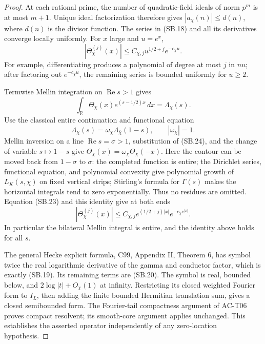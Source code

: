\begin{proof}
At each rational prime, the number of quadratic-field ideals of
norm \(p^m\) is at most \(m+1\).  Unique ideal factorization therefore
gives \(|a_\chi(n)|\leq d(n)\), where \(d(n)\) is the divisor
function.  The series in (SB.18) and all its derivatives converge
locally uniformly.  For \(x\) large and \(u=e^x\),
\[
 |\Theta_\chi^{(j)}(x)|
       \leq C_{\chi,j}u^{1/2+j}e^{-c_\chi u}.                  \tag{SB.23}
\]
For example, differentiating produces a polynomial of degree at
most \(j\) in \(nu\); after factoring out \(e^{-c_\chi u}\),
the remaining series is bounded uniformly for \(u\geq2\).

Termwise Mellin integration on \(\operatorname{Re}s>1\) gives
\[
 \int_{\mathbb R}\Theta_\chi(x)e^{(s-1/2)x}\,dx
       =\Lambda_\chi(s).
\]
Use the classical entire continuation and functional equation
\[
 \Lambda_\chi(s)=\omega_\chi\Lambda_{\overline\chi}(1-s),
 \qquad|\omega_\chi|=1.
                                                               \tag{SB.24}
\]
Mellin inversion on a line \(\operatorname{Re}s=\sigma>1\),
substitution of (SB.24), and the change of variable \(s\mapsto1-s\)
give
\(\Theta_\chi(x)=\omega_\chi\Theta_{\overline\chi}(-x)\).
Here the contour can be moved back from \(1-\sigma\) to \(\sigma\):
the completed function is entire; the Dirichlet series,
functional equation, and polynomial convexity give polynomial
growth of \(L_K(s,\chi)\) on fixed vertical strips; Stirling's
formula for \(\Gamma(s)\) makes the horizontal integrals tend
to zero exponentially.  Thus no residues are omitted.
Equation (SB.23) and this identity give at both ends
\[
 |\Theta_\chi^{(j)}(x)|
 \leq C_{\chi,j}e^{(1/2+j)|x|}
                              e^{-c_\chi e^{|x|}}.
                                                               \tag{SB.25}
\]
In particular the bilateral Mellin integral is entire, and the
identity above holds for all \(s\).

The general Hecke explicit formula, C99, Appendix II, Theorem 6,
has symbol twice the real logarithmic derivative of the gamma
and conductor factor, which is exactly (SB.19).
Its remaining terms are (SB.20).  The symbol is real, bounded
below, and \(2\log|t|+O_\chi(1)\) at infinity.  Restricting its
closed weighted Fourier form to \(I_L\), then adding the finite
bounded Hermitian translation sum, gives a closed semibounded
form.  The Fourier-tail compactness argument of AC-T06 proves
compact resolvent; its smooth-core argument applies unchanged.
This establishes the asserted operator independently of any
zero-location hypothesis.


\end{proof}
